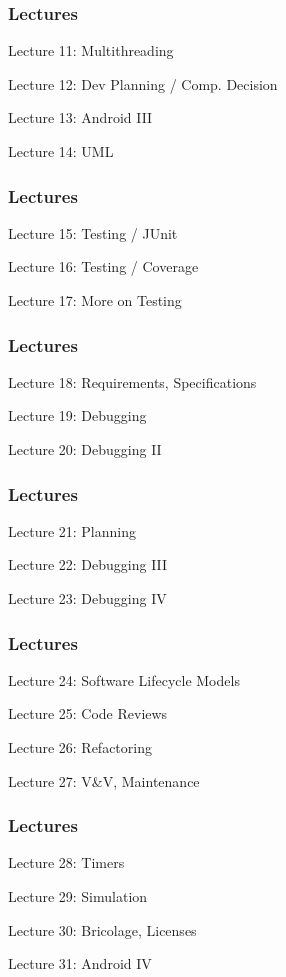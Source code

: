 \begin{frame}
\frametitle{Lectures}

{\LARGE

Lecture 11: Multithreading

Lecture 12: Dev Planning / Comp. Decision

Lecture 13: Android III

Lecture 14: UML
}

\end{frame}

\begin{frame}
\frametitle{Lectures}

{\LARGE

Lecture 15: Testing / JUnit

Lecture 16: Testing / Coverage

Lecture 17: More on Testing

}

\end{frame}

\begin{frame}
\frametitle{Lectures}

{\LARGE

Lecture 18: Requirements, Specifications

Lecture 19: Debugging

Lecture 20: Debugging II
}

\end{frame}

\begin{frame}
\frametitle{Lectures}
{\LARGE

Lecture 21: Planning

Lecture 22: Debugging III

Lecture 23: Debugging IV
}

\end{frame}

\begin{frame}
\frametitle{Lectures}
{\LARGE

Lecture 24: Software Lifecycle Models

Lecture 25: Code Reviews

Lecture 26: Refactoring

Lecture 27: V\&V, Maintenance
}

\end{frame}


\begin{frame}
\frametitle{Lectures}
{\LARGE

Lecture 28: Timers

Lecture 29: Simulation

Lecture 30: Bricolage, Licenses

Lecture 31: Android IV
}

\end{frame}

